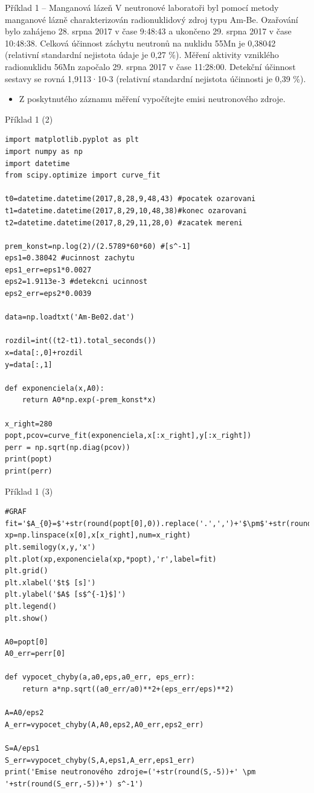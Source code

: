 \documentclass[10pt]{beamer}
\begin{document}
\begin{frame}[fragile]{Příklad 1 -- Manganová lázeň}
V neutronové laboratoři byl pomocí metody manganové lázně charakterizován radionuklidový zdroj typu Am-Be. Ozařování bylo zahájeno 28. srpna 2017 v čase 9:48:43 a ukončeno 29. srpna 2017 v čase 10:48:38. Celková účinnost záchytu neutronů na nuklidu 55Mn je 0,38042 (relativní standardní nejistota údaje je 0,27 \%). Měření aktivity vzniklého radionuklidu 56Mn započalo 29. srpna 2017 v čase 11:28:00. Detekční účinnost sestavy se rovná 1,9113·10-3 (relativní standardní nejistota účinnosti je 0,39 \%). 
\begin{itemize}
    \item Z poskytnutého záznamu měření vypočítejte emisi neutronového zdroje.
\end{itemize}
\end{frame}

\begin{frame}[fragile]{Příklad 1 (2)}
\begin{lstlisting}[columns=flexible]
import matplotlib.pyplot as plt
import numpy as np
import datetime
from scipy.optimize import curve_fit

t0=datetime.datetime(2017,8,28,9,48,43) #pocatek ozarovani
t1=datetime.datetime(2017,8,29,10,48,38)#konec ozarovani
t2=datetime.datetime(2017,8,29,11,28,0) #zacatek mereni

prem_konst=np.log(2)/(2.5789*60*60) #[s^-1]
eps1=0.38042 #ucinnost zachytu
eps1_err=eps1*0.0027
eps2=1.9113e-3 #detekcni ucinnost
eps2_err=eps2*0.0039

data=np.loadtxt('Am-Be02.dat')

rozdil=int((t2-t1).total_seconds())
x=data[:,0]+rozdil
y=data[:,1]

def exponenciela(x,A0):
    return A0*np.exp(-prem_konst*x)

x_right=280
popt,pcov=curve_fit(exponenciela,x[:x_right],y[:x_right])
perr = np.sqrt(np.diag(pcov))
print(popt)
print(perr)
\end{lstlisting}
\end{frame}

\begin{frame}[fragile]{Příklad 1 (3)}
\begin{lstlisting}[columns=flexible]
#GRAF
fit='$A_{0}=$'+str(round(popt[0],0)).replace('.',',')+'$\pm$'+str(round(perr[0],0)).replace('.',',')
xp=np.linspace(x[0],x[x_right],num=x_right)
plt.semilogy(x,y,'x')
plt.plot(xp,exponenciela(xp,*popt),'r',label=fit)
plt.grid()
plt.xlabel('$t$ [s]')
plt.ylabel('$A$ [s$^{-1}$]')
plt.legend()
plt.show()

A0=popt[0]
A0_err=perr[0]

def vypocet_chyby(a,a0,eps,a0_err, eps_err):
    return a*np.sqrt((a0_err/a0)**2+(eps_err/eps)**2)

A=A0/eps2
A_err=vypocet_chyby(A,A0,eps2,A0_err,eps2_err)

S=A/eps1
S_err=vypocet_chyby(S,A,eps1,A_err,eps1_err)
print('Emise neutronového zdroje=('+str(round(S,-5))+' \pm '+str(round(S_err,-5))+') s^-1')
\end{lstlisting}
\end{frame}
\end{document}
